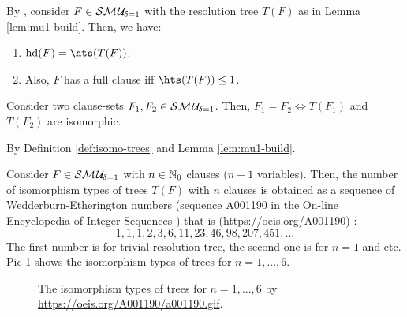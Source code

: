 \documentclass{report}
\begin{document}
\begin{lem}\label{lem:smu1hs1}
By \cite{GwynneKullmann2013GoodRepresentations}, consider $F \in \mathcal{S}\mathcal{M\hspace{0.8pt}U}_{\!\delta=1}$ with the resolution tree $T(F)$ as in Lemma \ref{lem:mu1-build}. Then, we have:
  \begin{enumerate}
  \item $\hardness(F) = \hts(T(F))$.
  \item Also, $F$ has a full clause iff $\hts(T(F)) \le 1$.
  \end{enumerate}
\end{lem}

\begin{lem}\label{lem:mu1-iso}
Consider two clause-sets $F_1,F_2 \in \mathcal{S}\mathcal{M\hspace{0.8pt}U}_{\!\delta=1}$. Then, $F_1=F_2 \iff T(F_1) $ and $T(F_2)$ are isomorphic.
\end{lem}    
\begin{prf}
By Definition \ref{def:isomo-trees} and Lemma \ref{lem:mu1-build}.
\end{prf}                                                                                                     
                                                                                                                                                                                                                                           
\begin{lem}\label{lem:mu1-iso-num}
Consider $F \in \mathcal{S}\mathcal{M\hspace{0.8pt}U}_{\!\delta=1}$ with $n \in \mathbb{N}_0$ clauses ($n-1$ variables). Then, the number of isomorphism types of trees $T(F)$ with $n$ clauses is obtained as a sequence of Wedderburn-Etherington numbers (sequence A001190 in the On-line Encyclopedia of Integer Sequences \cite{Sloane2008OEIS}) that is (\url{https://oeis.org/A001190}) :
\begin{displaymath}
 1, 1, 1, 2, 3, 6, 11, 23, 46, 98, 207, 451, ...
\end{displaymath}
The first number is for trivial resolution tree, the second one is for $n=1$ and etc. Pic \ref{fig:isotree} shows the isomorphism types of trees for $n=1,..., 6$.
 \begin{figure}
   \begin{center}
   \caption{The isomorphism types of trees for $n=1,..., 6$ by \url{https://oeis.org/A001190/a001190.gif}.}
   \label{fig:isotree}
   \end{center}
   \end{figure}
\end{lem}   
                             
\end{document}
